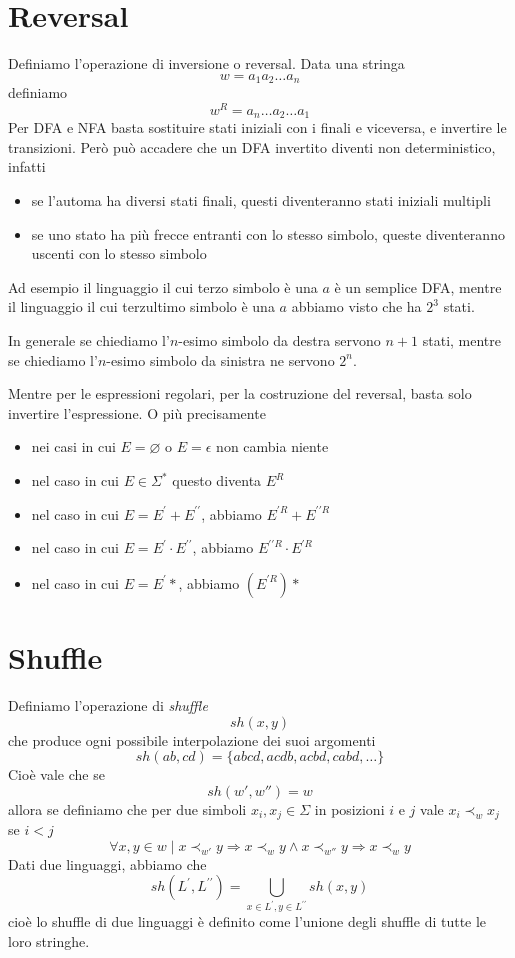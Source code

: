 \documentclass[12pt]{report}
\begin{document}
\section{Reversal}
Definiamo l'operazione di inversione o reversal.
Data una stringa 
$$ w = a_1 a_2 \dots a_n $$
definiamo
$$ w^R = a_n \dots a_2 \dots a_1 $$
Per DFA e NFA basta sostituire stati iniziali con i finali e viceversa, e invertire le transizioni.
Però può accadere che un DFA invertito diventi non deterministico, infatti 
\begin{itemize}
	\item se l'automa ha diversi stati finali, questi diventeranno stati iniziali multipli
	\item se uno stato ha più frecce entranti con lo stesso simbolo, queste diventeranno uscenti con lo stesso simbolo
\end{itemize}
\begin{tcolorbox}
	Ad esempio il linguaggio il cui terzo simbolo è una $a$ è un semplice DFA, mentre il linguaggio il cui terzultimo simbolo è una $a$ abbiamo visto che ha $2^3$ stati. %

	In generale se chiediamo l'$n$-esimo simbolo da destra servono $n + 1$ stati, mentre se chiediamo l'$n$-esimo simbolo da sinistra ne servono $2^n$.
\end{tcolorbox}

Mentre per le espressioni regolari, per la costruzione del reversal, basta solo invertire l'espressione.
O più precisamente
\begin{itemize}
	\item nei casi in cui $E = \varnothing$ o $E = \epsilon$ non cambia niente
	\item nel caso in cui $E \in \Sigma^*$ questo diventa $E^R$
	\item nel caso in cui $E = E^\prime + E^{\prime\prime}$, abbiamo $E^{\prime R} + E^{\prime\prime R}$
	\item nel caso in cui $E = E^\prime \cdot E^{\prime\prime}$, abbiamo $E^{\prime\prime R} \cdot E^{\prime R}$
	\item nel caso in cui $E = E^{\prime}*$, abbiamo $(E^{\prime R})*$
\end{itemize}

\section{Shuffle}
Definiamo l'operazione di \textit{shuffle}
$$ sh(x, y) $$
che produce ogni possibile interpolazione dei suoi argomenti 
$$ sh(ab, cd) = \{ abcd, acdb, acbd, cabd, \dots  \} $$
Cioè vale che se
$$ sh(w', w'') = w $$
allora se definiamo che per due simboli $x_i, x_j \in \Sigma$ in posizioni $i$ e $j$ vale $x_i \prec_w x_j$ se $i < j$
$$ \forall x, y \in w \mid x \prec_{w'} y \Rightarrow x \prec_w y \wedge x \prec_{w''} y \Rightarrow x \prec_w y $$
Dati due linguaggi, abbiamo che
$$ sh(L^\prime, L^{\prime\prime}) = \bigcup_{x \in L^\prime, y \in L^{\prime\prime}} sh(x, y) $$
cioè lo shuffle di due linguaggi è definito come l'unione degli shuffle di tutte le loro stringhe.
\end{document}
